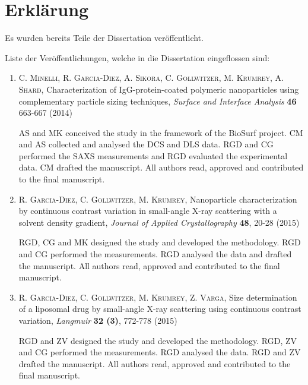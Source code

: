 \noindent
\pagestyle{empty}

\section*{Erklärung}

Es wurden bereits Teile der Dissertation veröffentlicht.
\vspace{2ex}

Liste der Veröffentlichungen, welche in die Dissertation eingeflossen sind:

\begin{enumerate}

    \item \textsc{C. Minelli, R. Garcia-Diez, A. Sikora, C. Gollwitzer, M. Krumrey, A. Shard}, Characterization of IgG-protein-coated polymeric nanoparticles using complementary particle sizing techniques, \emph{Surface and Interface Analysis} \textbf{46} 663-667 (2014)

        \hspace{20pt} AS and MK conceived the study in the framework of the BioSurf project. CM and AS collected and analysed the DCS and DLS data. RGD and CG performed the SAXS measurements and RGD evaluated the experimental data. CM drafted the manuscript. All authors read, approved and contributed to the final manuscript.

    \item \textsc{R. Garcia-Diez, C. Gollwitzer, M. Krumrey}, Nanoparticle characterization by continuous contrast variation in small-angle {{X}}-ray scattering with a solvent density gradient, \emph{Journal of Applied Crystallography} \textbf{48}, 20-28 (2015)

        \hspace{20pt} RGD, CG and MK designed the study and developed the methodology. RGD and CG performed the measurements. RGD analysed the data and drafted the manuscript. All authors read, approved and contributed to the final manuscript.

    \item \textsc{R. Garcia-Diez, C. Gollwitzer, M. Krumrey, Z. Varga}, Size determination of a liposomal drug by small-angle X-ray scattering using continuous contrast variation, \emph{Langmuir} \textbf{32 (3)}, 772-778 (2015)

        \hspace{20pt} RGD and ZV designed the study and developed the methodology. RGD, ZV and CG performed the measurements. RGD analysed the data. RGD and ZV drafted the manuscript. All authors read, approved and contributed to the final manuscript.
        

\end{enumerate}

